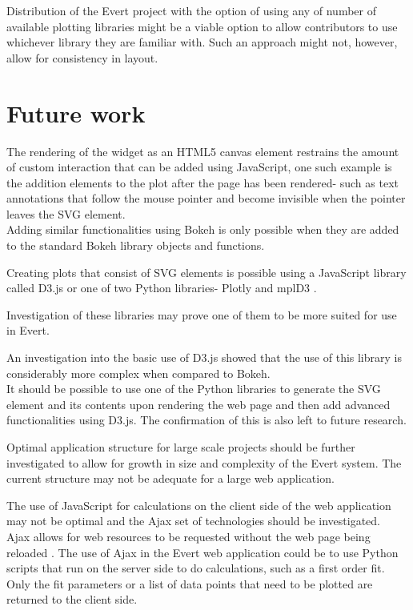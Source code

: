 \documentclass[a4paper,12pt]{article}
\begin{document}
Distribution of the Evert project with the option of using any of number of available plotting libraries might be a viable option to allow contributors to use whichever library they are familiar with. Such an approach might not, however, allow for consistency in layout.

\section{Future work}
The rendering of the widget as an HTML5 canvas element restrains the amount of custom interaction that can be added using JavaScript, one such example is the addition elements to the plot after the page has been rendered- such as text annotations that follow the mouse pointer and become invisible when the pointer leaves the SVG element.\\Adding similar functionalities using Bokeh is only possible when they are added to the standard Bokeh library objects and functions.

Creating plots that consist of SVG elements is possible using a JavaScript library called D3.js or one of two Python libraries- Plotly and mplD3 \citep{d3, plotly, mpld3}.

Investigation of these libraries may prove one of them to be more suited for use in Evert.

An investigation into the basic use of D3.js showed that the use of this library is considerably more complex when compared to Bokeh.\\It should be possible to use one of the Python libraries to generate the SVG element and its contents upon rendering the web page and then add advanced functionalities using D3.js. The confirmation of this is also left to future research.

Optimal application structure for large scale projects should be further investigated to allow for growth in size and complexity of the Evert system. The current structure may not be adequate for a large web application.

The use of JavaScript for calculations on the client side of the web application may not be optimal and the Ajax set of technologies should be investigated.\\Ajax allows for web resources to be requested without the web page being reloaded \citep{powers}. The use of Ajax in the Evert web application could be to use Python scripts that run on the server side to do calculations, such as a first order fit. Only the fit parameters or a list of data points that need to be plotted are returned to the client side.
\end{document}
